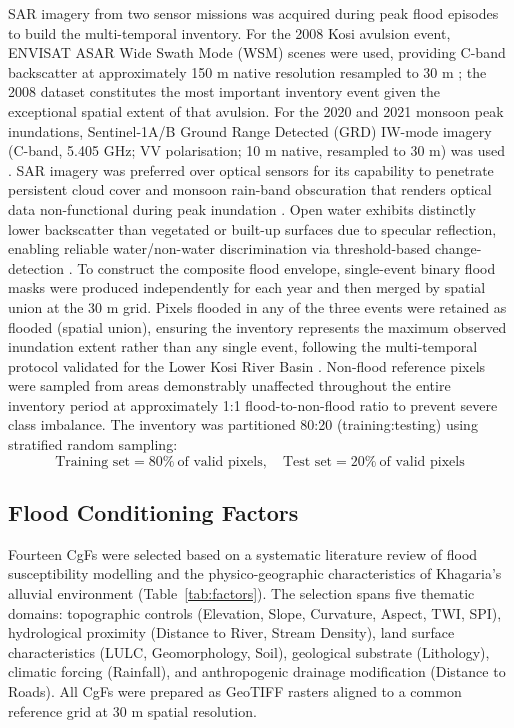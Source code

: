 \documentclass[12pt, a4paper]{article}
\begin{document}
SAR imagery from two sensor missions was acquired during peak flood episodes to build the multi-temporal inventory. For the 2008 Kosi avulsion event, ENVISAT ASAR Wide Swath Mode (WSM) scenes were used, providing C-band backscatter at approximately 150 m native resolution resampled to 30 m \citep{Twele2016}; the 2008 dataset constitutes the most important inventory event given the exceptional spatial extent of that avulsion. For the 2020 and 2021 monsoon peak inundations, Sentinel-1A/B Ground Range Detected (GRD) IW-mode imagery (C-band, 5.405 GHz; VV polarisation; 10 m native, resampled to 30 m) was used \citep{DeVries2020, dasgupta2018}. SAR imagery was preferred over optical sensors for its capability to penetrate persistent cloud cover and monsoon rain-band obscuration that renders optical data non-functional during peak inundation \citep{srivastava2017}. Open water exhibits distinctly lower backscatter than vegetated or built-up surfaces due to specular reflection, enabling reliable water/non-water discrimination via threshold-based change-detection \citep{bauer2015, Twele2016}. To construct the composite flood envelope, single-event binary flood masks were produced independently for each year and then merged by spatial union at the 30 m grid. Pixels flooded in any of the three events were retained as flooded (spatial union), ensuring the inventory represents the maximum observed inundation extent rather than any single event, following the multi-temporal protocol validated for the Lower Kosi River Basin \citep{Arora2022SERRA}. Non-flood reference pixels were sampled from areas demonstrably unaffected throughout the entire inventory period at approximately 1:1 flood-to-non-flood ratio to prevent severe class imbalance. The inventory was partitioned 80:20 (training:testing) using stratified random sampling:
\begin{equation}
    \text{Training set} = 80\%\ \text{of valid pixels},\quad \text{Test set} = 20\%\ \text{of valid pixels}
\end{equation}

\subsection{Flood Conditioning Factors}

Fourteen CgFs were selected based on a systematic literature review of flood susceptibility modelling \citep{khosravi2018, tehrany2019, rahmati2016, Costache2022, Pourghasemi2020, Pandey2021FrontEarth, Arora2022SERRA} and the physico-geographic characteristics of Khagaria's alluvial environment (Table~\ref{tab:factors}). The selection spans five thematic domains: topographic controls (Elevation, Slope, Curvature, Aspect, TWI, SPI), hydrological proximity (Distance to River, Stream Density), land surface characteristics (LULC, Geomorphology, Soil), geological substrate (Lithology), climatic forcing (Rainfall), and anthropogenic drainage modification (Distance to Roads). All CgFs were prepared as GeoTIFF rasters aligned to a common reference grid at 30 m spatial resolution.
\end{document}

